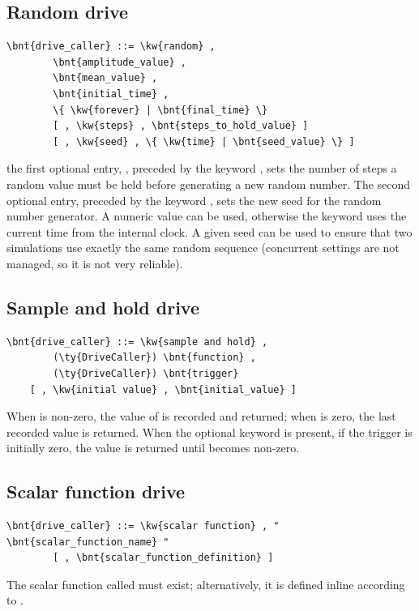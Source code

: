\subsection{Random drive}
\begin{Verbatim}[commandchars=\\\{\}]
    \bnt{drive_caller} ::= \kw{random} ,
        \bnt{amplitude_value} ,
        \bnt{mean_value} ,
        \bnt{initial_time} ,
        \{ \kw{forever} | \bnt{final_time} \}
        [ , \kw{steps} , \bnt{steps_to_hold_value} ]
        [ , \kw{seed} , \{ \kw{time} | \bnt{seed_value} \} ]
\end{Verbatim}
the first optional entry, ,
preceded by the keyword , sets the
number of steps a random value must be held before generating a new
random number.
The second optional entry, preceded by the keyword
, sets the new seed for the random number generator.
A numeric  value can be used,
otherwise the keyword  uses the current time from
the internal clock.
A given seed can be used to ensure that two
simulations use exactly the same random sequence (concurrent settings 
are not managed, so it is not very reliable).

\subsection{Sample and hold drive}
\begin{Verbatim}[commandchars=\\\{\}]
    \bnt{drive_caller} ::= \kw{sample and hold} ,
        (\ty{DriveCaller}) \bnt{function} ,
        (\ty{DriveCaller}) \bnt{trigger}
	[ , \kw{initial value} , \bnt{initial_value} ]
\end{Verbatim}
When  is non-zero, the value of 
is recorded and returned; when  is zero,
the last recorded value is returned.
When the optional keyword  is present,
if the trigger is initially zero, the value 
is returned until  becomes non-zero.

\subsection{Scalar function drive}
\begin{Verbatim}[commandchars=\\\{\}]
    \bnt{drive_caller} ::= \kw{scalar function} , " \bnt{scalar_function_name} "
        [ , \bnt{scalar_function_definition} ]
\end{Verbatim}
The scalar function called  must exist;
alternatively, it is defined inline according to
.


